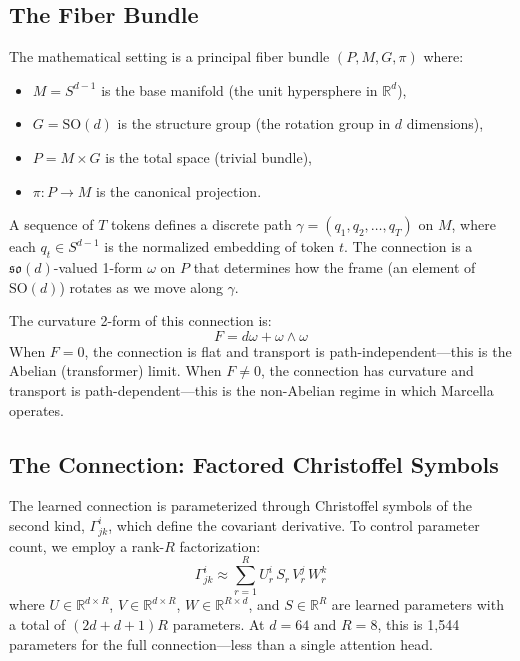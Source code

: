 \documentclass[11pt,a4paper]{article}
\theoremstyle{definition}
\theoremstyle{remark}
\newcommand{\R}{\mathbb{R}}
\newcommand{\SO}{\mathrm{SO}}
\begin{document}
\subsection{The Fiber Bundle}
\label{subsec:fiber-bundle}

The mathematical setting is a principal fiber bundle $(P, M, G, \pi)$ 
where:
\begin{itemize}
    \item $M = S^{d-1}$ is the base manifold (the unit hypersphere 
    in $\R^d$),
    \item $G = \SO(d)$ is the structure group (the rotation group 
    in $d$ dimensions),
    \item $P = M \times G$ is the total space (trivial bundle),
    \item $\pi: P \to M$ is the canonical projection.
\end{itemize}

\noindent A sequence of $T$ tokens defines a discrete path 
$\gamma = (q_1, q_2, \ldots, q_T)$ on $M$, where each $q_t \in 
S^{d-1}$ is the normalized embedding of token $t$. The connection 
is a $\mathfrak{so}(d)$-valued 1-form $\omega$ on $P$ that 
determines how the frame (an element of $\SO(d)$) rotates as we 
move along $\gamma$.

The curvature 2-form of this connection is:
\begin{equation}
    F = d\omega + \omega \wedge \omega
\label{eq:curvature-2form}
\end{equation}
When $F = 0$, the connection is flat and transport is 
path-independent---this is the Abelian (transformer) limit. When 
$F \neq 0$, the connection has curvature and transport is 
path-dependent---this is the non-Abelian regime in which Marcella 
operates.

\subsection{The Connection: Factored Christoffel Symbols}
\label{subsec:connection}

The learned connection is parameterized through Christoffel symbols 
of the second kind, $\Gamma^i_{jk}$, which define the covariant 
derivative. To control parameter count, we employ a rank-$R$ 
factorization:
\begin{equation}
    \Gamma^i_{jk} \approx \sum_{r=1}^{R} U^i_r \, S_r \, V^j_r \, W^k_r
\label{eq:christoffel-factored}
\end{equation}
where $U \in \R^{d \times R}$, $V \in \R^{d \times R}$, $W \in 
\R^{R \times d}$, and $S \in \R^R$ are learned parameters with a 
total of $(2d + d + 1)R$ parameters. At $d = 64$ and $R = 8$, this 
is 1{,}544 parameters for the full connection---less than a single 
attention head.
\end{document}
